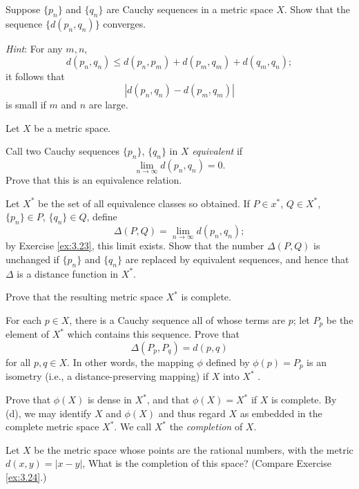\begin{myExercise}
    \label{ex:3.23}
    Suppose $\{p_n\}$ and $\{q_n\}$ are Cauchy sequences in a metric space $X$. 
    Show that the sequence $\{d(p_n, q_n)\}$ converges. 
    
    \emph{Hint}: For any $m, n$,
    \begin{equation*}
        d(p_n, q_n) \leq d(p_n, p_m) + d(p_m, q_m) + d(q_m , q_n);
    \end{equation*}
    it follows that 
    \begin{equation*}
        \left| d(p_n, q_n) - d(p_m, q_m) \right| 
    \end{equation*}
    is small if $m$ and $n$ are large.
\end{myExercise}


\begin{myExercise}
    \label{ex:3.24}
    Let $X$ be a metric space.
    \begin{asparaenum}[(a)]
        \item Call two Cauchy sequences $\{p_n\}$, $\{q_n\}$ in $X$ \emph{equivalent} if
        \begin{equation*}
            \lim_{n \to \infty}  d(p_n, q_n) = 0.
        \end{equation*}
        Prove that this is an equivalence relation.
        \item Let $X^*$ be the set of all equivalence classes so obtained. If $P \in x^*$, $Q \in X^*$, $\{p_n\} \in P$, $\{q_n\} \in Q$, define
        \begin{equation*}
            \Delta(P, Q) = \lim_{n \to \infty} d (p_n, q_n) ;
        \end{equation*}
        by Exercise \ref{ex:3.23}, this limit exists. Show that the number $\Delta(P, Q)$ is unchanged if $\{p_n\}$ and $\{q_n\}$ are replaced by equivalent sequences, and hence that $\Delta$ is a distance
        function in $X^*$.
        \item Prove that the resulting metric space $X^*$ is complete.
        \item For each $p \in X$, there is a Cauchy sequence all of whose terms are $p$; let $P_p$ be the element of $X^*$ which contains this sequence. Prove that
        \begin{equation*}
            \Delta(P_p, P_q) = d(p, q)
        \end{equation*}
        for all $p, q \in X$. 
        In other words, the mapping $\phi$ defined by $\phi(p) = P_p$ is an isometry (i.e., a distance-preserving mapping) if $X$ into $X^*$ .
        \item Prove that $\phi(X)$ is dense in $X^*$, and that $\phi(X) = X^*$ if $X$ is complete. By (d), we may identify $X$ and $\phi(X)$ and thus regard $X$ as embedded in the complete metric space $X^*$. We call $X^*$ the \emph{completion} of $X$.
    \end{asparaenum}
\end{myExercise}


\begin{myExercise}
    \label{ex:3.25}
    Let $X$ be the metric space whose points are the rational numbers, with the metric $d(x, y) =|x - y|$, What is the completion of this space? (Compare Exercise \ref{ex:3.24}.)
\end{myExercise}